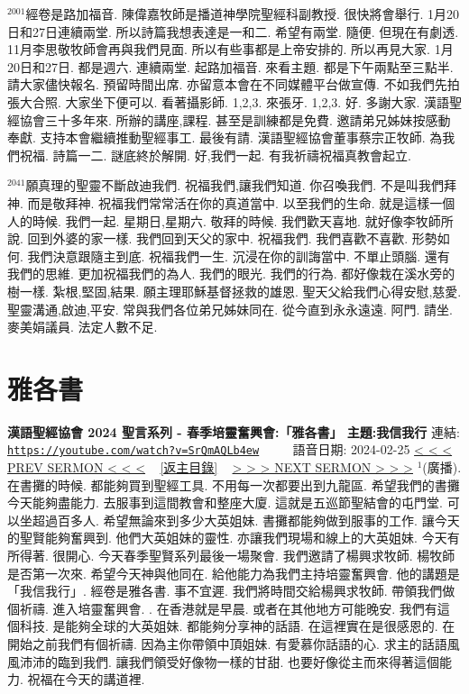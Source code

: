 \documentclass{book}
\begin{document}
$^{2001}$經卷是路加福音.
陳偉嘉牧師是播道神學院聖經科副教授.
很快將會舉行.
1月20日和27日連續兩堂.
所以詩篇我想表達是一和二.
希望有兩堂.
隨便.
但現在有劇透.
11月李思敬牧師會再與我們見面.
所以有些事都是上帝安排的.
所以再見大家.
1月20日和27日.
都是週六.
連續兩堂.
起路加福音.
來看主題.
都是下午兩點至三點半.
請大家儘快報名.
預留時間出席.
亦留意本會在不同媒體平台做宣傳.
不如我們先拍張大合照.
大家坐下便可以.
看著攝影師.
1,2,3.
來張牙.
1,2,3.
好.
多謝大家.
漢語聖經協會三十多年來.
所辦的講座,課程.
甚至是訓練都是免費.
邀請弟兄姊妹按感動奉獻.
支持本會繼續推動聖經事工.
最後有請.
漢語聖經協會董事蔡宗正牧師.
為我們祝福.
詩篇一二.
謎底終於解開.
好,我們一起.
有我祈禱祝福真教會起立.

$^{2041}$願真理的聖靈不斷啟迪我們.
祝福我們,讓我們知道.
你召喚我們.
不是叫我們拜神.
而是敬拜神.
祝福我們常常活在你的真道當中.
以至我們的生命.
就是這樣一個人的時候.
我們一起.
星期日,星期六.
敬拜的時候.
我們歡天喜地.
就好像李牧師所說.
回到外婆的家一樣.
我們回到天父的家中.
祝福我們.
我們喜歡不喜歡.
形勢如何.
我們決意跟隨主到底.
祝福我們一生.
沉浸在你的訓誨當中.
不單止頭腦.
還有我們的思維.
更加祝福我們的為人.
我們的眼光.
我們的行為.
都好像栽在溪水旁的樹一樣.
紮根,堅固,結果.
願主理耶穌基督拯救的雄恩.
聖天父給我們心得安慰,慈愛.
聖靈溝通,啟迪,平安.
常與我們各位弟兄姊妹同在.
從今直到永永遠遠.
阿門.
請坐.
麥美娟議員.
法定人數不足.
\newpage



\section{雅各書}
\label{sec:SrQmAQLb4ew}
\textbf{漢語聖經協會 2024 聖言系列 - 春季培靈奮興會:「雅各書」 主題:我信我行}
\newline
\newline
連結: \href{https://youtube.com/watch?v=SrQmAQLb4ew}{\texttt{https://youtube.com/watch?v=SrQmAQLb4ew}} ~~~~ 語音日期: 2024-02-25
\newline
\newline
\hyperref[sec:A_3yEYQkm9Y]{\small{< < < PREV SERMON < < <}}
~
\hyperref[sec:index]{\small{[返主目錄]}}
~
\hyperref[sec:h6V3lBcFI1I]{\small{> > > NEXT SERMON > > >}}
\newline
\newline
$^{1}$(廣播).
在書攤的時候.
都能夠買到聖經工具.
不用每一次都要出到九龍區.
希望我們的書攤今天能夠盡能力.
去服事到這間教會和整座大廈.
這就是五巡節聖結會的屯門堂.
可以坐超過百多人.
希望無論來到多少大英姐妹.
書攤都能夠做到服事的工作.
讓今天的聖賢能夠奮興到.
他們大英姐妹的靈性.
亦讓我們現場和線上的大英姐妹.
今天有所得著.
很開心.
今天春季聖賢系列最後一場聚會.
我們邀請了楊興求牧師.
楊牧師是否第一次來.
希望今天神與他同在.
給他能力為我們主持培靈奮興會.
他的講題是「我信我行」.
經卷是雅各書.
事不宜遲.
我們將時間交給楊興求牧師.
帶領我們做個祈禱.
進入培靈奮興會.
.
在香港就是早晨.
或者在其他地方可能晚安.
我們有這個科技.
是能夠全球的大英姐妹.
都能夠分享神的話語.
在這裡實在是很感恩的.
在開始之前我們有個祈禱.
因為主你帶領中頂姐妹.
有愛慕你話語的心.
求主的話語風風沛沛的臨到我們.
讓我們領受好像物一樣的甘甜.
也要好像從主而來得著這個能力.
祝福在今天的講道裡.
\end{document}
